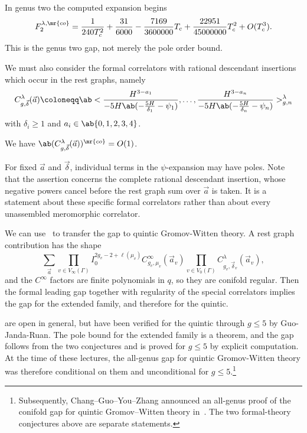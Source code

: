 \begin{exm}
    In genus two the computed expansion begins
    \[ F_2^{\lambda,\mr{co}} = \frac{1}{240T_c^2} + \frac{31}{6000} - \frac{7169}{3600000}T_c + \frac{22951}{45000000}T_c^2 + O(T_c^3). \]
    This is the genus two gap, not merely the pole order bound.
\end{exm}

We must also consider the formal correlators with rational descendant insertions which occur in the rest graphs, namely
\[ C^{\lambda}_{g,\vec{\delta}}(\vec{a}) \coloneqq \ab< \frac{H^{3-a_1}}{-5H\ab(-\frac{5H}{\delta_1}-\psi_1)}, \ldots, \frac{H^{3-a_n}}{-5H\ab(-\frac{5H}{\delta_n}-\psi_n)}>^{\lambda}_{g,n} \]
with \(\delta_i \geq 1\) and \(a_i \in \ab\{0,1,2,3,4\}\).

\begin{conj}%
\label{conj:special correlator regularity}
    We have \(\ab(C^{\lambda}_{g,\vec{\delta}}(\vec{a}))^{\mr{co}} = O(1)\).
\end{conj}

For fixed \(\vec{a}\) and \(\vec{\delta}\), individual terms in the \(\psi\)-expansion may have poles. Note that the assertion concerns the complete rational descendant insertion, whose negative powers cancel before the rest graph sum over \(\vec{a}\) is taken. It is a statement about these specific formal correlators rather than about every unassembled meromorphic correlator.

We can use~ to transfer the gap to quintic Gromov-Witten theory. A rest graph contribution has the shape
\[ \sum_{\vec{a}} \prod_{v \in V_{\infty}(\Gamma)}I_0^{2g_v-2+\ell(\mu_v)}C^{\infty}_{g_v,\mu_v}(\vec{a}_v)\prod_{v\in V_0(\Gamma)}C^{\lambda}_{g_v,\vec{\delta}_v}(\vec{a}_v), \]
and the \(C^{\infty}\) factors are finite polynomials in \(q\), so they are conifold regular. Then the formal leading gap together with regularity of the special correlators implies the gap for the extended family, and therefore for the quintic.

\begin{rmk}
     are open in general, but have been verified for the quintic through \(g \leq 5\) by Guo-Janda-Ruan. The pole bound for the extended family is a theorem, and the gap follows from the two conjectures and is proved for \(g \leq 5\) by explicit computation. At the time of these lectures, the all-genus gap for quintic Gromov-Witten theory was therefore conditional on them and unconditional for \(g \leq 5\).\footnote{Subsequently, Chang--Guo--You--Zhang announced an all-genus proof of the conifold gap for quintic Gromov--Witten theory in~\cite{CGYZ2026}. The two formal-theory conjectures above are separate statements.}
\end{rmk}

